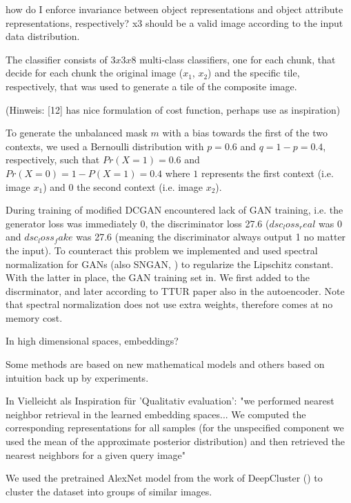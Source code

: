 \documentclass[10pt,letterpaper]{article}
\begin{document}
how do I enforce invariance between object representations and object attribute representations, respectively?
x3 should be a valid image according to the input data distribution.

The classifier consists of $3x3x8$ multi-class classifiers, one for each chunk, that decide for each chunk the original image ($x_1$, $x_2$) and the specific tile, respectively, that was used to generate a tile of the composite image.

(Hinweis: [12] has nice formulation of cost function, perhaps use as inspiration)

\par To generate the unbalanced mask $m$ with a bias towards the first of the two contexts, we used a Bernoulli distribution with $p=0.6$ and $q=1-p=0.4$, respectively, such that $Pr(X=1)=0.6$ and $Pr(X=0)=1-P(X=1)=0.4$ where $1$ represents the first context (i.e. image $x_1$) and $0$ the second context (i.e. image $x_2$).

\par During training of modified DCGAN encountered lack of GAN training, i.e. the generator loss was immediately 0, the discriminator loss 27.6 ($dsc_loss_real$ was 0 and $dsc_loss_fake$ was 27.6 (meaning the discriminator always output 1 no matter the input). To counteract this problem we implemented and used spectral normalization for GANs (also SNGAN, \cite{1802.05957}) to regularize the Lipschitz constant. With the latter in place, the GAN training set in. We first added to the discrminator, and later according to TTUR paper also in the autoencoder. Note that spectral normalization does not use extra weights, therefore comes at no memory cost.

\par In high dimensional spaces, embeddings?

\par Some methods are based on new mathematical models and others based on intuition back up by experiments.

\par In \cite{1611.03383} Vielleicht als Inspiration für 'Qualitativ evaluation': "we performed nearest neighbor retrieval in the learned embedding spaces... We computed the corresponding representations for all samples (for the unspecified component we used the mean of the approximate posterior distribution) and then retrieved the nearest neighbors for a given query image"

\par We used the pretrained AlexNet model from the work of DeepCluster (\cite{1807.05520}) to cluster the dataset into groups of similar images.
\end{document}
